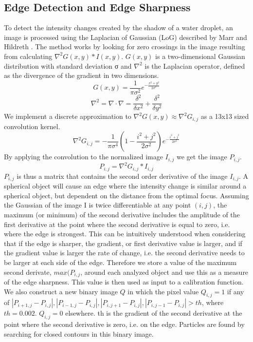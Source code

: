 \subsection{Edge Detection and Edge Sharpness}

To detect the intensity changes created by the shadow of a water droplet, an image is processed using the Laplacian of Gaussian (LoG) described by Marr and Hildreth \cite{marr1980}. The method works by looking for zero crossings in the image resulting from calculating $\nabla^2 G\left(x,y\right) * I\left(x,y\right)$. $G\left(x,y\right)$ is a two-dimensional Gaussian distribution with standard deviation σ and $\nabla^2$ is the Laplacian operator, defined as the divergence of the gradient in two dimensions.
\begin{equation}
G\left(x,y\right) = \frac{1}{\pi \sigma^2} e^{-\frac{x^2+y^2}{2\sigma^2}}
\end{equation}
\begin{equation}
\nabla^2=\nabla\cdot\nabla=\frac{\delta^2}{\delta x^2} + \frac{\delta^2}{\delta y^2}
\end{equation}
We implement a discrete approximation to $\nabla^2 G\left(x,y\right) \approx \nabla^2 G_{i,j}$ as a 13x13 sized convolution kernel.
\begin{equation}
\nabla^2 G_{i,j} = -\frac{1}{\pi \sigma^4} \left(1 - \frac{i^2+j^2}{2\sigma^2} \right) e^{-\frac{i^2+j^2}{2\sigma^2}}
\end{equation}
By applying the convolution to the normalized image $I_{i,j}$ we get the image $P_{i,j}$.
\begin{equation}
P_{i,j}=\nabla^2 G_{i,j} * I_{i,j}
\end{equation}
$P_{i,j}$ is thus a matrix that contains the second order derivative of the image $I_{i,j}$. 
A spherical object will cause an edge where the intensity change is similar around a spherical object, but dependent on the distance from the optimal focus. Assuming the Gaussian of the image I is twice differentiable at any point $(i,j)$, the maximum (or minimum) of the second derivative includes the amplitude of the first derivative at the point where the second derivative is equal to zero, i.e. where the edge is strongest. This can be intuitively understood when considering that if the edge is sharper, the gradient, or first derivative value is larger, and if the gradient value is larger the rate of change, i.e. the second derivative needs to be larger at each side of the edge. Therefore we store a value of the maximum second derivate, $max(P_{i,j}$, around each analyzed object and use this as a measure of the edge sharpness. This value is then used as input to a calibration function. 
We also construct a new binary image $Q$ in which the pixel value $Q_{i,j}=1$ if any of $|P_{i+1,j}-P_{i,j} |,|P_{i-1,j}-P_{i,j} |,|P_{i,j+1}-P_{i,j} |,|P_{i,j-1}-P_{i,j} |>th$, where $th=0.002$. $Q_{i,j}=0$ elsewhere. th is the gradient of the second derivative at the point where the second derivative is zero, i.e. on the edge. Particles are found by searching for closed contours in this binary image.

